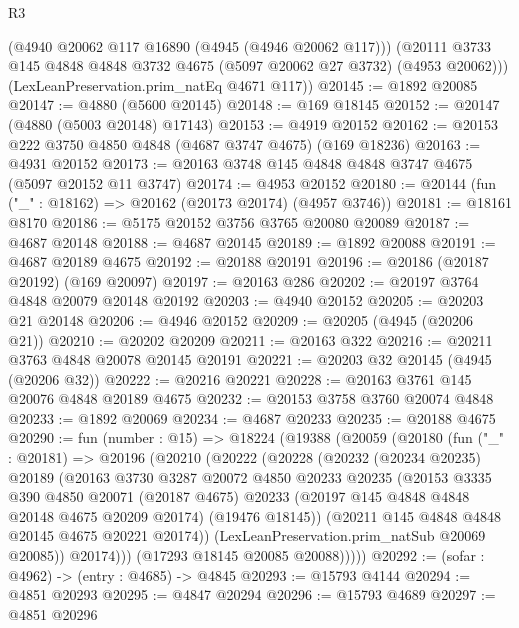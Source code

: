 \begin{lexlean}{R3}
\begin{coremodule}
        (@4940 @20062 @117 @16890 (@4945 (@4946 @20062 @117)))
        (@20111 @3733 @145 @4848 @4848 @3732 @4675 (@5097 @20062 @27 @3732) (@4953 @20062)))
      (LexLeanPreservation.prim_natEq @4671 @117))
@20145 := @1892 @20085
@20147 := @4880 (@5600 @20145)
@20148 := @169 @18145
@20152 := @20147 (@4880 (@5003 @20148) @17143)
@20153 := @4919 @20152
@20162 := @20153 @222 @3750 @4850 @4848 (@4687 @3747 @4675) (@169 @18236)
@20163 := @4931 @20152
@20173 := @20163 @3748 @145 @4848 @4848 @3747 @4675 (@5097 @20152 @11 @3747)
@20174 := @4953 @20152
@20180 := @20144 (fun ("_" : @18162) => @20162 (@20173 @20174) (@4957 @3746))
@20181 := @18161 @8170
@20186 := @5175 @20152 @3756 @3765 @20080 @20089
@20187 := @4687 @20148
@20188 := @4687 @20145
@20189 := @1892 @20088
@20191 := @4687 @20189 @4675
@20192 := @20188 @20191
@20196 := @20186 (@20187 @20192) (@169 @20097)
@20197 := @20163 @286
@20202 := @20197 @3764 @4848 @20079 @20148 @20192
@20203 := @4940 @20152
@20205 := @20203 @21 @20148
@20206 := @4946 @20152
@20209 := @20205 (@4945 (@20206 @21))
@20210 := @20202 @20209
@20211 := @20163 @322
@20216 := @20211 @3763 @4848 @20078 @20145 @20191
@20221 := @20203 @32 @20145 (@4945 (@20206 @32))
@20222 := @20216 @20221
@20228 := @20163 @3761 @145 @20076 @4848 @20189 @4675
@20232 := @20153 @3758 @3760 @20074 @4848
@20233 := @1892 @20069
@20234 := @4687 @20233
@20235 := @20188 @4675
@20290 := fun (number : @15) =>
  @18224
    (@19388
      (@20059
        (@20180
          (fun ("_" : @20181) =>
          @20196
            (@20210
              (@20222
                (@20228
                  (@20232
                    (@20234 @20235)
                    @20189
                    (@20163
                      @3730
                      @3287
                      @20072
                      @4850
                      @20233
                      @20235
                      (@20153
                        @3335
                        @390
                        @4850
                        @20071
                        (@20187 @4675)
                        @20233
                        (@20197 @145 @4848 @4848 @20148 @4675 @20209 @20174)
                        (@19476 @18145))
                      (@20211 @145 @4848 @4848 @20145 @4675 @20221 @20174))
                    (LexLeanPreservation.prim_natSub @20069 @20085))
                  @20174)))
            (@17293 @18145 @20085 @20088)))))
@20292 := (sofar : @4962) -> (entry : @4685) -> @4845
@20293 := @15793 @4144
@20294 := @4851 @20293
@20295 := @4847 @20294
@20296 := @15793 @4689
@20297 := @4851 @20296

\end{coremodule}
\end{lexlean}
